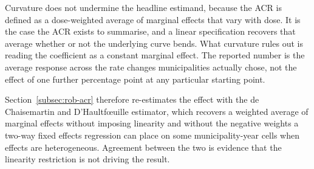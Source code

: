 \documentclass[12pt]{article}
\begin{document}
Curvature does not undermine the headline estimand, because the ACR is
defined as a dose-weighted average of marginal effects that vary with
dose. It is the case the ACR exists to summarise, and a linear
specification recovers that average whether or not the underlying curve
bends. What curvature rules out is reading the coefficient as a constant
marginal effect. The reported number is the average response across the
rate changes municipalities actually chose, not the effect of one further
percentage point at any particular starting point.

Section~\ref{subsec:rob-acr}
therefore re-estimates the effect with the de Chaisemartin and
D'Haultf\oe uille estimator, which recovers a weighted average of
marginal effects without imposing linearity and without the negative
weights a two-way fixed effects regression can place on some
municipality-year cells when effects are heterogeneous. Agreement between
the two is evidence that the linearity restriction is not driving the
result.
\end{document}
